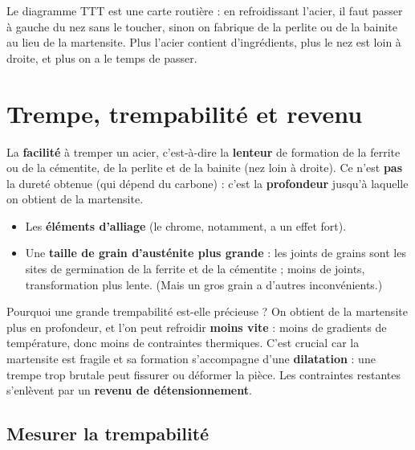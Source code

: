 \begin{goatbox}
Le diagramme TTT est une carte routière : en refroidissant l'acier, il faut passer à gauche du
\og nez\fg{} sans le toucher, sinon on fabrique de la perlite ou de la bainite au lieu de la
martensite. Plus l'acier contient d'ingrédients, plus le nez est loin à droite, et plus on a le
temps de passer.
\end{goatbox}

\section{Trempe, trempabilité et revenu}

\begin{defnbox}[title={Trempabilité (\emph{hardenability})}]
La \textbf{facilité} à tremper un acier, c'est-à-dire la \textbf{lenteur} de formation de la
ferrite ou de la cémentite, de la perlite et de la bainite (nez loin à droite). Ce n'est
\textbf{pas} la dureté obtenue (qui dépend du carbone) : c'est la \textbf{profondeur} jusqu'à
laquelle on obtient de la martensite.
\end{defnbox}

\begin{propbox}[title={Ce qui augmente la trempabilité}]
\begin{itemize}
  \item Les \textbf{éléments d'alliage} (le chrome, notamment, a un effet fort).
  \item Une \textbf{taille de grain d'austénite plus grande} : les joints de grains sont les sites
        de germination de la ferrite et de la cémentite ; moins de joints, transformation plus
        lente. (Mais un gros grain a d'autres inconvénients.)
\end{itemize}
\end{propbox}

Pourquoi une grande trempabilité est-elle précieuse ? On obtient de la martensite plus en
profondeur, et l'on peut refroidir \textbf{moins vite} : moins de gradients de température,
donc moins de contraintes thermiques. C'est crucial car la martensite est fragile et sa formation
s'accompagne d'une \textbf{dilatation} : une trempe trop brutale peut fissurer ou déformer la
pièce. Les contraintes restantes s'enlèvent par un \textbf{revenu de détensionnement}.

\subsection*{Mesurer la trempabilité}

